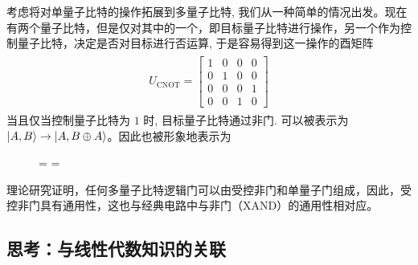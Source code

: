 考虑将对单量子比特的操作拓展到多量子比特, 我们从一种简单的情况出发。现在有两个量子比特，但是仅对其中的一个，即目标量子比特进行操作，另一个作为控制量子比特，决定是否对目标进行否运算, 于是容易得到这一操作的酉矩阵 \begin{align}\begin{aligned}
        U_{\text{CNOT}}=\begin{bmatrix}
                            1 & 0 & 0 & 0 \\
                            0 & 1 & 0 & 0 \\
                            0 & 0 & 0 & 1 \\
                            0 & 0 & 1 & 0
                        \end{bmatrix}
    \end{aligned}\end{align}
当且仅当控制量子比特为 $1$ 时, 目标量子比特通过非门. 可以被表示为 $|A,B\rangle\to|A,B\oplus A\rangle$。因此也被形象地表示为
\begin{figure}[htbp]
    \label{fig:cnot-gate}
    \centering
    =
    =
\end{figure}

理论研究证明，任何多量子比特逻辑门可以由受控非门和单量子门组成\cite{}，因此，受控非门具有通用性，这也与经典电路中与非门（XAND）的通用性相对应。

\newpage
\subsection*{思考：与线性代数知识的关联}

